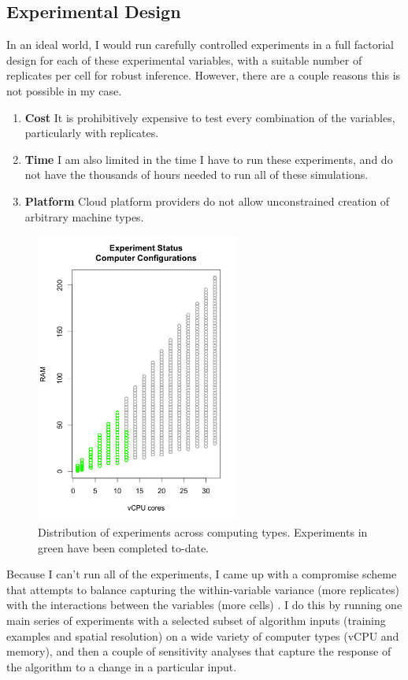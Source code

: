 \documentclass[a4paper]{article}
\begin{document}
\subsection{Experimental Design}
In an ideal world, I would run carefully controlled experiments in a full factorial design for each of these experimental variables, with a suitable number of replicates per cell for robust inference.  However, there are a couple reasons this is not possible in my case.  
\begin{enumerate}
\item \textbf{Cost} It is prohibitively expensive to test every combination of the variables, particularly with replicates.  
\item \textbf{Time} I am also limited in the time I have to run these experiments, and do not have the thousands of hours needed to run all of these simulations.
\item \textbf{Platform} Cloud platform providers do not allow unconstrained creation of arbitrary machine types.
\end{enumerate}

\begin{figure}
	\centering
		\includegraphics[width=0.6\textwidth]{config_status.png}
	\caption{Distribution of experiments across computing types.  Experiments in green have been completed to-date.}\label{fig:conf_status}
\end{figure}

Because I can't run all of the experiments, I came up with a compromise scheme that attempts to balance capturing the within-variable variance (more replicates) with the interactions between the variables (more cells) .  I do this by running one main series of experiments with a selected subset of algorithm inputs (training examples and spatial resolution) on a wide variety of computer types (vCPU and memory), and then a couple of sensitivity analyses that capture the response of the algorithm to a change in a particular input. 
\end{document}
